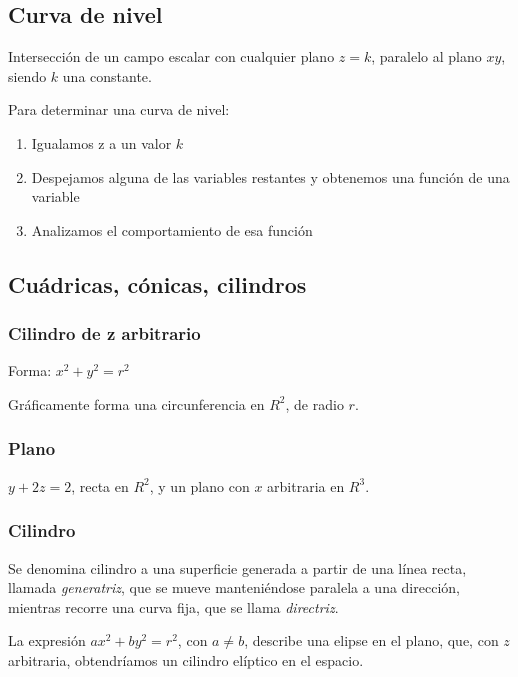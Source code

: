 \subsection{Curva de nivel}

Intersección de un campo escalar con cualquier plano \(z = k\), paralelo al 
plano \(xy\), siendo \(k\) una constante.

Para determinar una curva de nivel:
\begin{enumerate}
    \item Igualamos z a un valor \(k\)
    \item Despejamos alguna de las variables restantes y obtenemos una función 
    de una variable
    \item Analizamos el comportamiento de esa función
\end{enumerate}

\subsection{Cuádricas, cónicas, cilindros}

\subsubsection{Cilindro de z arbitrario}

Forma: \(x^{2} + y^{2} = r^{2}\)

Gráficamente forma una circunferencia en \(R^{2}\),
de radio \(r\).

\subsubsection{Plano}

\(y + 2z = 2\), recta en \(R^{2}\), 
y un plano con \(x\) arbitraria en \(R^{3}\).

\subsubsection{Cilindro}

Se denomina cilindro a una superficie generada a partir de una línea recta,
llamada \textit{generatriz}, 
que se mueve manteniéndose paralela a una dirección,
mientras recorre una curva fija, que se llama \textit{directriz}.

La expresión \(ax^{2} + by^{2} = r^{2}\),
con \(a \neq b\), describe una elipse en el plano,
que, con \(z\) arbitraria, 
obtendríamos un cilindro elíptico en el espacio.

